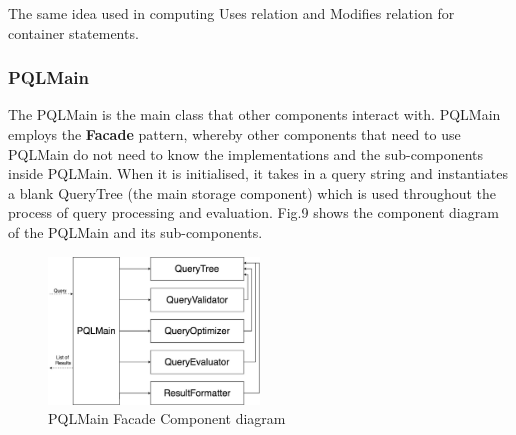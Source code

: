 \documentclass[12pt]{article}
\begin{document}
{{{{{{{{{{{{{The same idea used in computing Uses relation and Modifies relation for container statements.

\subsubsection{PQLMain}
The PQLMain is the main class that other components interact with. PQLMain employs the \textbf{Facade} pattern, whereby other components that need to use PQLMain do not need to know the implementations and the sub-components inside PQLMain. When it is initialised, it takes in a query string and instantiates a blank QueryTree (the main storage component) which is used throughout the process of  query processing and evaluation. Fig.9 shows the component diagram of the PQLMain and its sub-components. \newline
\begin{figure}[H]
  \caption{PQLMain Facade Component diagram}
  \centering 
 \includegraphics[width=0.5\textwidth]{PQLComponents.jpg}
\end{figure}
}}}}}}}}}}}}}
\end{document}

